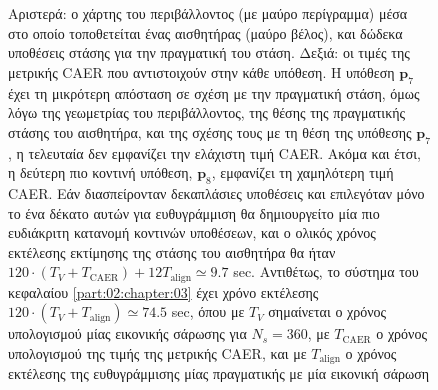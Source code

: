 \begin{figure}\centering
  \vspace{-2.5cm}
  
  \vspace{-2.5cm}
  \caption{\small Αριστερά: ο χάρτης του περιβάλλοντος (με μαύρο περίγραμμα) μέσα
           στο οποίο τοποθετείται ένας αισθητήρας (μαύρο βέλος), και δώδεκα
           υποθέσεις στάσης για την πραγματική του στάση. Δεξιά: οι τιμές της
           μετρικής CAER που αντιστοιχούν στην κάθε υπόθεση. Η υπόθεση
           $\bm{p}_7$ έχει τη μικρότερη απόσταση σε σχέση με την πραγματική
           στάση, όμως λόγω της γεωμετρίας του περιβάλλοντος, της θέσης της
           πραγματικής στάσης του αισθητήρα, και της σχέσης τους με τη θέση της
           υπόθεσης $\bm{p}_7$, η τελευταία δεν εμφανίζει την ελάχιστη τιμή
           CAER. Ακόμα και έτσι, η δεύτερη πιο κοντινή υπόθεση, $\bm{p}_8$,
           εμφανίζει τη χαμηλότερη τιμή CAER. Εάν διασπείρονταν δεκαπλάσιες
           υποθέσεις και επιλεγόταν μόνο το ένα δέκατο αυτών για ευθυγράμμιση
           θα δημιουργείτο μία πιο ευδιάκριτη κατανομή κοντινών υποθέσεων, και
           ο ολικός χρόνος εκτέλεσης εκτίμησης της στάσης του αισθητήρα θα ήταν
           $120\cdot(T_V + T_{\text{CAER}}) + 12T_{\text{align}}  \simeq 9.7$
           sec. Αντιθέτως, το σύστημα του κεφαλαίου \ref{part:02:chapter:03}
           έχει χρόνο εκτέλεσης $120\cdot(T_V + T_{\text{align}}) \simeq 74.5$
           sec, όπου με $T_V$ σημαίνεται ο χρόνος υπολογισμού μίας εικονικής
           σάρωσης για $N_s=360$, με $T_{\text{CAER}}$ ο χρόνος υπολογισμού της
           τιμής της μετρικής CAER, και με $T_{\text{align}}$ ο χρόνος
           εκτέλεσης της ευθυγράμμισης μίας πραγματικής με μία εικονική σάρωση}
  \label{fig:03_02_01:global_loc}
\end{figure}

